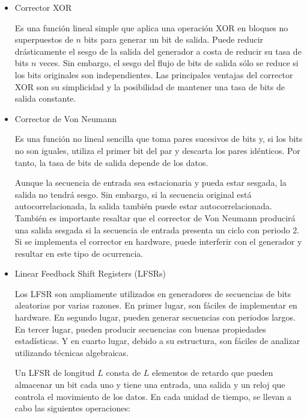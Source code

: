             \begin{itemize}
                \item Corrector XOR 
                
                    Es una función lineal simple que aplica una operación XOR en bloques no superpuestos de $n$ bits para generar un bit de salida. Puede reducir drásticamente el sesgo de la salida del generador a costa de reducir su tasa de bits $n$ veces. Sin embargo, el sesgo del flujo de bits de salida sólo se reduce si los bits originales son independientes. Las principales ventajas del corrector XOR son su simplicidad y la posibilidad de mantener una tasa de bits de salida constante.

                \item Corrector de Von Neumann
                
                    Es una función no lineal sencilla que toma pares sucesivos de bits y, si los bits no son iguales, utiliza el primer bit del par y descarta los pares idénticos. Por tanto, la tasa de bits de salida depende de los datos.

                    Aunque la secuencia de entrada sea estacionaria y pueda estar sesgada, la salida no tendrá sesgo. Sin embargo, si la secuencia original está autocorrelacionada, la salida también puede estar autocorrelacionada. También es importante resaltar que el corrector de Von Neumann producirá una salida sesgada si la secuencia de entrada presenta un ciclo con periodo 2. Si se implementa el corrector en hardware, puede interferir con el generador y resultar en este tipo de ocurrencia.

                \item Linear Feedback Shift Registers (LFSRs)
                
                    Los LFSR son ampliamente utilizados en generadores de secuencias de bits aleatorias por varias razones. En primer lugar, son fáciles de implementar en hardware. En segundo lugar, pueden generar secuencias con periodos largos. En tercer lugar, pueden producir secuencias con buenas propiedades estadísticas. Y en cuarto lugar, debido a su estructura, son fáciles de analizar utilizando técnicas algebraicas.

                    Un LFSR de longitud $L$ consta de $L$ elementos de retardo que pueden almacenar un bit cada uno y tiene una entrada, una salida y un reloj que controla el movimiento de los datos. En cada unidad de tiempo, se llevan a cabo las siguientes operaciones:


\end{itemize}
